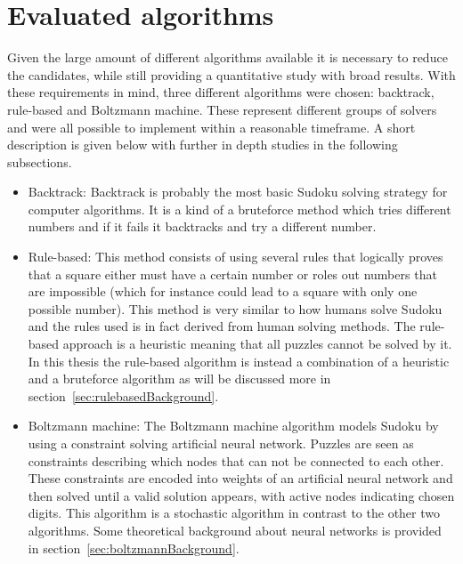 \documentclass[a4paper,11pt]{kth-mag}
\begin{document}
\section{Evaluated algorithms}
Given the large amount of different algorithms available it is necessary to reduce the candidates, while still providing a quantitative study with broad results.
With these requirements in mind, three different algorithms were chosen: backtrack, rule-based and Boltzmann machine.
These represent different groups of solvers and were all possible to implement within a reasonable timeframe.
A short description is given below with further in depth studies in the following subsections.
\begin{itemize}
    \item Backtrack:
    Backtrack is probably the most basic Sudoku solving strategy for computer algorithms.
It is a kind of a bruteforce method which tries different numbers and if it fails it backtracks and try a different number.
    \item Rule-based:
    This method consists of using several rules that logically proves that a square either must have a certain number or roles out numbers that are impossible (which for instance could lead to a square with only one possible number).
This method is very similar to how humans solve Sudoku and the rules used is in fact derived from human solving methods.
The rule-based approach is a heuristic meaning that all puzzles cannot be solved by it. In this thesis the rule-based algorithm is instead a combination of a heuristic and a bruteforce algorithm as will be discussed more in section~\ref{sec:rulebasedBackground}.
    \item Boltzmann machine:
    The Boltzmann machine algorithm models Sudoku by using a constraint solving artificial neural network.
Puzzles are seen as constraints describing which nodes that can not be connected to each other.
These constraints are encoded into weights of an artificial neural network and then solved until a valid solution appears, with active nodes indicating chosen digits. 
This algorithm is a stochastic algorithm in contrast to the other two algorithms. Some theoretical background about neural networks is provided in section~\ref{sec:boltzmannBackground}.
\end{itemize}

\FloatBarrier
\end{document}
